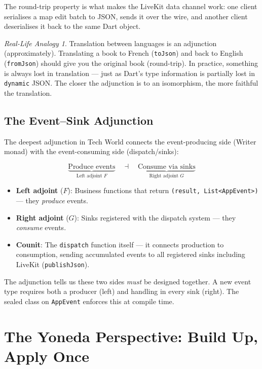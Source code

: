 \documentclass[12pt,a4paper]{article}
\theoremstyle{definition}
\theoremstyle{plain}
\theoremstyle{remark}
\newtheorem*{reallife}{Real-Life Analogy}
\begin{document}
The round-trip property is what makes the LiveKit data channel work:
one client serialises a map edit batch to JSON, sends it over the wire,
and another client deserialises it back to the same Dart object.

\begin{reallife}
Translation between languages is an adjunction (approximately).
Translating a book to French (\texttt{toJson}) and back to English
(\texttt{fromJson}) should give you the original book (round-trip).
In practice, something is always lost in translation --- just as
Dart's type information is partially lost in \texttt{dynamic} JSON.
The closer the adjunction is to an isomorphism,
the more faithful the translation.
\end{reallife}

\subsection{The Event--Sink Adjunction}

The deepest adjunction in Tech World connects the event-producing side
(Writer monad) with the event-consuming side (dispatch/sinks):

\[
\underbrace{\text{Produce events}}_{\text{Left adjoint } F}
\quad \dashv \quad
\underbrace{\text{Consume via sinks}}_{\text{Right adjoint } G}
\]

\begin{itemize}
  \item \textbf{Left adjoint} ($F$): Business functions that return
        \texttt{(result, List<AppEvent>)} --- they \emph{produce} events.
  \item \textbf{Right adjoint} ($G$): Sinks registered with the dispatch
        system --- they \emph{consume} events.
  \item \textbf{Counit}: The \texttt{dispatch} function itself ---
        it connects production to consumption, sending accumulated events
        to all registered sinks including LiveKit (\texttt{publishJson}).
\end{itemize}

The adjunction tells us these two sides \emph{must} be designed together.
A new event type requires both a producer (left) and handling in every
sink (right). The sealed class on \texttt{AppEvent} enforces this at
compile time.


\section{The Yoneda Perspective: Build Up, Apply Once}
\label{sec:yoneda}
\end{document}
